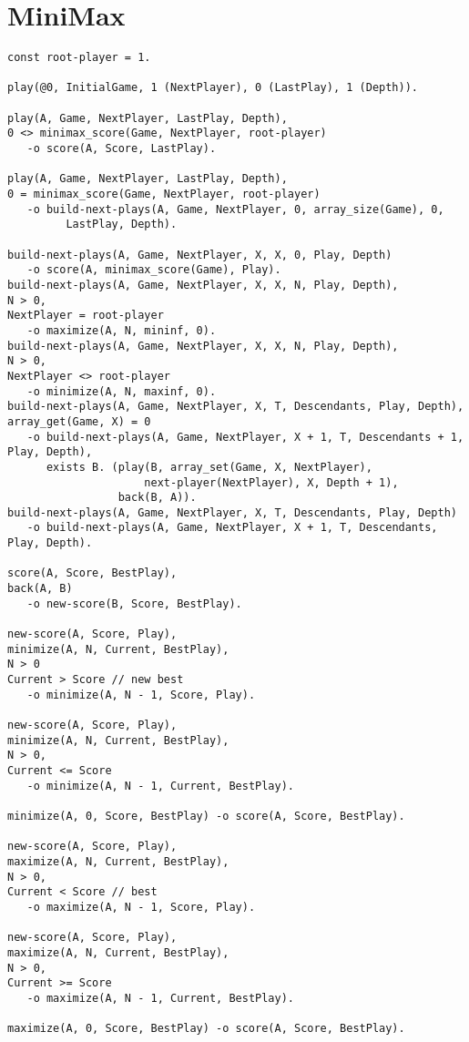 \documentclass[9pt]{article}
\begin{document}
\section{MiniMax}

\begin{verbatim}
const root-player = 1.

play(@0, InitialGame, 1 (NextPlayer), 0 (LastPlay), 1 (Depth)).

play(A, Game, NextPlayer, LastPlay, Depth),
0 <> minimax_score(Game, NextPlayer, root-player)
   -o score(A, Score, LastPlay).

play(A, Game, NextPlayer, LastPlay, Depth),
0 = minimax_score(Game, NextPlayer, root-player)
   -o build-next-plays(A, Game, NextPlayer, 0, array_size(Game), 0,
         LastPlay, Depth).

build-next-plays(A, Game, NextPlayer, X, X, 0, Play, Depth)
   -o score(A, minimax_score(Game), Play).
build-next-plays(A, Game, NextPlayer, X, X, N, Play, Depth),
N > 0,
NextPlayer = root-player
   -o maximize(A, N, mininf, 0).
build-next-plays(A, Game, NextPlayer, X, X, N, Play, Depth),
N > 0,
NextPlayer <> root-player
   -o minimize(A, N, maxinf, 0).
build-next-plays(A, Game, NextPlayer, X, T, Descendants, Play, Depth),
array_get(Game, X) = 0
   -o build-next-plays(A, Game, NextPlayer, X + 1, T, Descendants + 1, Play, Depth),
      exists B. (play(B, array_set(Game, X, NextPlayer),
                     next-player(NextPlayer), X, Depth + 1),
                 back(B, A)).
build-next-plays(A, Game, NextPlayer, X, T, Descendants, Play, Depth)
   -o build-next-plays(A, Game, NextPlayer, X + 1, T, Descendants, Play, Depth).

score(A, Score, BestPlay),
back(A, B)
   -o new-score(B, Score, BestPlay).

new-score(A, Score, Play),
minimize(A, N, Current, BestPlay),
N > 0
Current > Score // new best
   -o minimize(A, N - 1, Score, Play).

new-score(A, Score, Play),
minimize(A, N, Current, BestPlay),
N > 0,
Current <= Score
   -o minimize(A, N - 1, Current, BestPlay).

minimize(A, 0, Score, BestPlay) -o score(A, Score, BestPlay).

new-score(A, Score, Play),
maximize(A, N, Current, BestPlay),
N > 0,
Current < Score // best
   -o maximize(A, N - 1, Score, Play).

new-score(A, Score, Play),
maximize(A, N, Current, BestPlay),
N > 0,
Current >= Score
   -o maximize(A, N - 1, Current, BestPlay).

maximize(A, 0, Score, BestPlay) -o score(A, Score, BestPlay).
\end{verbatim}
\end{document}
